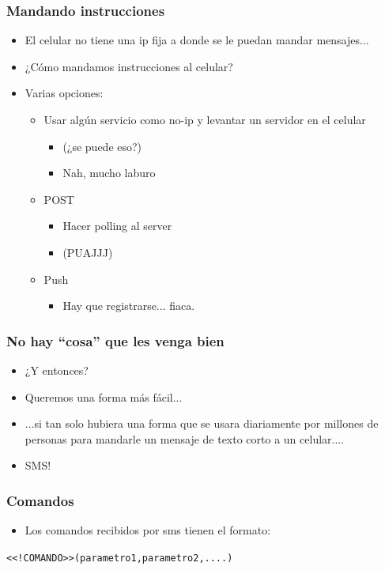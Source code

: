 \documentclass[ignorenonframetext,]{beamer}
\begin{document}
\begin{frame}\frametitle{Mandando instrucciones}
	\begin{itemize}[<+->]
		\item El celular no tiene una ip fija a donde se le puedan mandar mensajes...
		\item ¿Cómo mandamos instrucciones al celular?
		\item Varias opciones:
		\begin{itemize}[<+->]
			\item Usar algún servicio como no-ip y levantar un servidor en el celular
			\begin{itemize}[<+->]
				\item (¿se puede eso?)
				\item Nah, mucho laburo
			\end{itemize}
			\item POST
			\begin{itemize}[<+->]
				\item Hacer polling al server
				\item (PUAJJJ)
			\end{itemize}
			\item Push
			\begin{itemize}[<+->]
				\item Hay que registrarse... fiaca.
			\end{itemize}
		\end{itemize}
	\end{itemize}
\end{frame}

\begin{frame}\frametitle{No hay ``cosa'' que les venga bien}
	\begin{itemize}[<+->]
		\item ¿Y entonces?
		\item Queremos una forma más fácil...
		\item ...si tan solo hubiera una forma que se usara diariamente por millones de personas para mandarle un mensaje de texto corto a un celular....
		\item SMS!
	\end{itemize}
\end{frame}

\begin{frame}\frametitle{Comandos}
	\begin{itemize}[<+->]
		\item Los comandos recibidos por sms tienen el formato:
	\end{itemize}
	\begin{center}
		\texttt{<<!COMANDO>>(parametro1,parametro2,....)}
	\end{center}
\end{frame}
\end{document}
